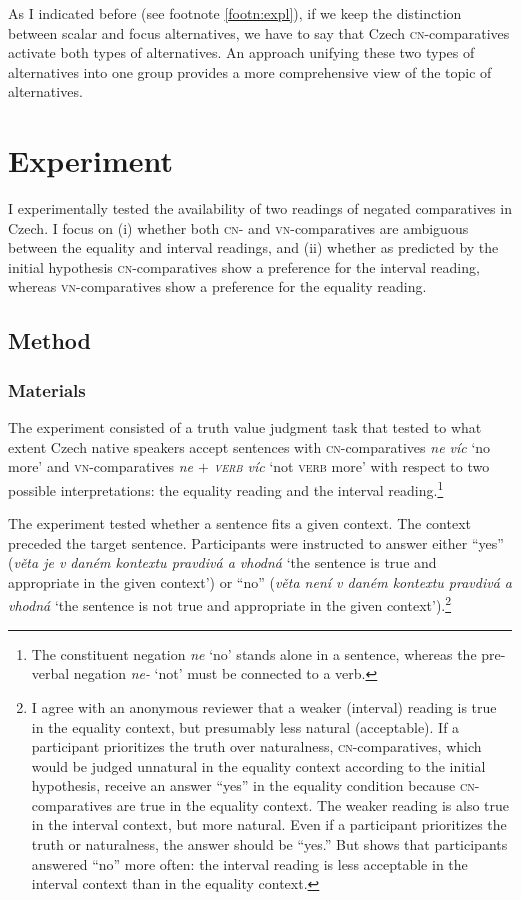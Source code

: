 \documentclass[output=paper,
]{langscibook}
\begin{document}
As I indicated before (see footnote \ref{footn:expl}), if we keep the distinction between scalar and focus alternatives, we have to say that Czech \textsc{cn-}comparatives activate both types of alternatives. An approach unifying these two types of alternatives into one group provides a more comprehensive view of the topic of alternatives.


\section{Experiment}

I experimentally tested the availability of two readings of negated comparatives in Czech. I focus on (i) whether both \textsc{cn-} and \textsc{vn-}comparatives are ambiguous between the equality and interval readings, and (ii) whether as predicted by the initial hypothesis \textsc{cn-}comparatives show a preference for the interval reading, whereas \textsc{vn-}comparatives show a preference for the equality reading. 

\subsection{Method}

\subsubsection{Materials}

The experiment consisted of a truth value judgment task that tested to what extent Czech native speakers accept sentences with \textsc{cn-}comparatives \textit{ne víc} `no more' and \textsc{vn-}comparatives \textit{ne $+$ \textsc{verb} víc} `not \textsc{verb} more' with respect to two possible interpretations: the equality reading and the interval reading.\footnote{The constituent negation \textit{ne} `no' stands alone in a sentence, whereas the pre-verbal negation \textit{ne-} `not' must be connected to a verb.}

The experiment tested whether a sentence fits a given context. The context preceded the target sentence. Participants were instructed to answer either ``yes'' (\textit{věta je v daném kontextu pravdivá a vhodná} `the sentence is true and appropriate in the given context') or ``no'' (\textit{věta není v daném kontextu pravdivá a vhodná} `the sentence is not true and appropriate in the given context').\footnote{I agree with an anonymous reviewer that a weaker (interval) reading is true in the equality context, but presumably less natural (acceptable). If a participant prioritizes the truth over naturalness, \textsc{cn}-comparatives, which would be judged unnatural in the equality context according to the initial hypothesis, receive an answer ``yes'' in the equality condition because  \textsc{cn-}comparatives are true in the equality context. The weaker reading is also true in the interval context, but more natural. Even if a participant prioritizes the truth or naturalness, the answer should be ``yes.'' But  shows that participants answered ``no'' more often: the interval reading is less acceptable in the interval context than in the equality context.}
\end{document}
